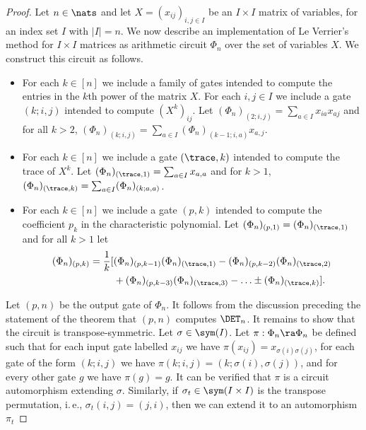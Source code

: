 \documentclass[11pt]{article}
\newcommand{\ie}{i.\,e.}
\begin{document}
\begin{proof}
  Let $n \in \nats$ and let $X = (x_{ij})_{i, j \in I}$ be an $I \times I$
  matrix of variables, for an index set $I$ with $\vert I \vert=n$. We now
  describe an implementation of Le Verrier's method for $I \times I$ matrices as
  arithmetic circuit $\Phi_n$ over the set of variables $X$. We construct this
  circuit as follows.
  \begin{itemize}
  \item For each $k \in [n]$ we include a family of gates intended to compute
    the entries in the $k$th power of the matrix $X$. For each $i, j \in I$ we
    include a gate $(k; i, j)$ intended to compute $(X^k)_{ij}$. Let
    $(\Phi_n)_{(2; i ,j)} = \sum_{a \in I} x_{ia} x_{aj}$ and for all $k > 2$,
    $(\Phi_n)_{(k; i ,j)} = \sum_{a \in I} (\Phi_n)_{(k-1; i, a)} x_{a, j}$.
  \item For each $k \in [n]$ we include a gate $(\trace, k)$ intended to compute
    the trace of $X^k$. Let $(\Phi_n)_{(\trace, 1)} = \sum_{a \in I} x_{a, a}$
    and for $k > 1$, $(\Phi_n)_{(\trace, k)} = \sum_{a \in I} (\Phi_n)_{(k; a,
      a)}$.
  \item For each $k \in [n]$ we include a gate $(p, k)$ intended to compute the
    coefficient $p_k$ in the characteristic polynomial. Let $(\Phi_n)_{(p, 1)} =
    (\Phi_n)_{(\trace, 1)}$ and for all $k > 1$ let
    \begin{align*}
      (\Phi_n)_{(p, k)} = \frac{1}{k}[&(\Phi_n)_{(p, k - 1)} (\Phi_n)_{(\trace, 1)} - (\Phi_n)_{(p, k - 2)} (\Phi_n)_{(\trace, 2)} \\ &+ (\Phi_n)_{(p, k - 3)} (\Phi_n)_{(\trace, 3)} - \ldots \pm (\Phi_n)_{(\trace, k)}].
    \end{align*}
  \end{itemize}
  Let $(p, n)$ be the output gate of $\Phi_n$. It follows from the discussion
  preceding the statement of the theorem that $(p, n)$ computes $\DET_n$.
  It remains to show that the circuit is transpose-symmetric. Let $\sigma \in
  \sym(I)$. Let $\pi : \Phi_n \ra \Phi_n$ be defined such that for each input
  gate labelled $x_{ij}$ we have $\pi (x_{ij}) = x_{\sigma(i)\sigma(j)}$, for
  each gate of the form $(k; i, j)$ we have $\pi (k; i, j) = (k;
  \sigma(i),\sigma(j))$, and for every other gate $g$ we have $\pi (g) = g$. It
  can be verified that $\pi$ is a circuit automorphism extending $\sigma$.
  Similarly, if $\sigma_t \in \sym(I \times I)$ is the transpose permutation,
  \ie, $\sigma_t(i,j) = (j,i)$, then we can extend it to an automorphism $\pi_t$

\end{proof}
\end{document}
